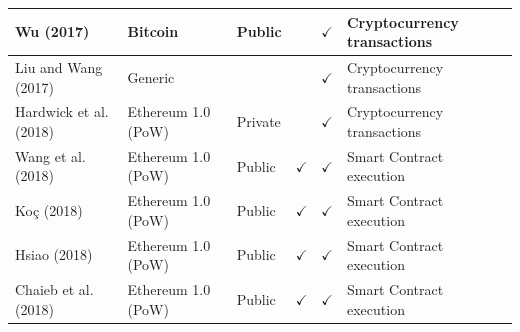 \documentclass[../access.tex]{subfiles}
\begin{document}
\begin{table}[htbp]
\begin{adjustwidth}{-2cm}{}
\begin{tabular}{m{4.4cm} >{\centering\arraybackslash}m{2.9cm} >{\centering\arraybackslash}m{1.0cm} >{\centering\arraybackslash}m{1.0cm} >{\centering\arraybackslash}m{1.5cm} >{\centering\arraybackslash}m{3.6cm}}
            \hline
            \footnotesize{Wu (2017) \cite{Wu2017}}                              & \footnotesize{Bitcoin}                         & \footnotesize{Public}                            & {}                                                     & $ \checkmark $                                        & \footnotesize{Cryptocurrency transactions} \\
            \hline
            \footnotesize{Liu and Wang (2017) \cite{Liu2017}}                   & \footnotesize{Generic}                         & {}                                               & {}                                                     & $ \checkmark $                                        & \footnotesize{Cryptocurrency transactions} \\
            \hline
            \footnotesize{Hardwick et al. (2018) \cite{Hardwick2018}}           & \footnotesize{Ethereum 1.0 (PoW)}              & \footnotesize{Private}                           & {}                                                     & $ \checkmark $                                        & \footnotesize{Cryptocurrency transactions} \\
            \hline
            \footnotesize{Wang et al. (2018) \cite{Wang2018}}                   & \footnotesize{Ethereum 1.0 (PoW)}              & \footnotesize{Public}                            & $ \checkmark $                                         & $ \checkmark $                                        & \footnotesize{Smart Contract execution}    \\
            \hline
            \footnotesize{Ko\c{c} (2018) \cite{Koc2018}}                        & \footnotesize{Ethereum 1.0 (PoW)}              & \footnotesize{Public}                            & $ \checkmark $                                         & $ \checkmark $                                        & \footnotesize{Smart Contract execution}    \\
            \hline
            \footnotesize{Hsiao (2018) \cite{Hsiao2018}}                        & \footnotesize{Ethereum 1.0 (PoW)}              & \footnotesize{Public}                            & $ \checkmark $                                         & $ \checkmark $                                        & \footnotesize{Smart Contract execution}    \\
            \hline
            \footnotesize{Chaieb et al. (2018) \cite{Chaieb2018}}               & \footnotesize{Ethereum 1.0 (PoW)}              & \footnotesize{Public}                            & $ \checkmark $                                         & $ \checkmark $                                        & \footnotesize{Smart Contract execution}    \\

\end{tabular}
\end{adjustwidth}
\end{table}
\end{document}
